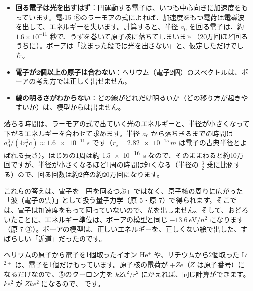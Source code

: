 \begin{itemize}[leftmargin=1.2\zw, itemsep=2pt, topsep=2pt, label={\color{bkTheme}●}]
\item \textbf{回る電子は光を出すはず}：円運動する電子は、いつも中心向きに加速度をもっています。電-15 ⑧のラーモアの式によれば、加速度をもつ電荷は電磁波を出して、エネルギーを失います。計算すると、半径 $a_0$ を回る電子は、約 $1.6\times10^{-11}$ 秒で、うずを巻いて原子核に落ちてしまいます（20万回ほど回るうちに）。ボーアは「決まった段では光を出さない」と、仮定しただけでした。
\item \textbf{電子が2個以上の原子は合わない}：ヘリウム（電子2個）のスペクトルは、ボーアの考え方では正しく出せません。
\item \textbf{線の明るさがわからない}：どの線がどれだけ明るいか（どの移り方が起きやすいか）は、模型からは出ません。
\end{itemize}
\begin{seikaku}
落ちる時間は、ラーモアの式で出ていく光のエネルギーと、半径が小さくなって下がるエネルギーを合わせて求めます。半径 $a_0$ から落ちきるまでの時間は $a_0^3/(4r_{\mathrm e}^2c)\approx\qty{1.6e-11}{s}$ です（$r_{\mathrm e}=\qty{2.82e-15}{m}$ は電子の古典半径とよばれる長さ）。はじめの1周は約 \qty{1.5e-16}{s} なので、そのままわると約10万回ですが、半径が小さくなるほど1周の時間は短くなる（半径の $\tfrac32$ 乗に比例する）ので、回る回数は約2倍の約20万回になります。
\end{seikaku}
これらの答えは、電子を「円を回るつぶ」ではなく、原子核の周りに広がった「波（電子の雲）」として扱う量子力学（原-5・原-7）で得られます。そこでは、電子は加速度をもって回っていないので、光を出しません。そして、おどろいたことに、エネルギー準位は、ボーアの模型と同じ $-13.6\ \text{eV}/n^2$ になります（原-7 ③）。ボーアの模型は、正しいエネルギーを、正しくない絵で出した、すばらしい「近道」だったのです。

\begin{phmodel}[ボーアの模型]
\end{phmodel}

\label{ph:原-4:sec8}
ヘリウムの原子から電子を1個取ったイオン He$^{+}$ や、リチウムから2個取った Li$^{2+}$ は、電子を1個だけもっています。原子核の電荷が $+Ze$（$Z$ は原子番号）になるだけなので、⑤のクーロン力を $kZe^2/r^2$ にかえれば、同じ計算ができます。$ke^2$ が $Zke^2$ になるので、
\label{ph:原-4:z}です。

